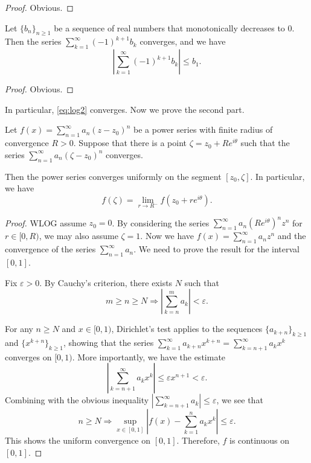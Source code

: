 \documentclass{article}
\begin{document}
\begin{proof}
    Obvious.
\end{proof}

\begin{corollary}
    Let $\{b_n\}_{n\geq 1}$ be a sequence of real numbers that monotonically decreases to $0$. Then the series $\sum_{k=1}^\infty (-1)^{k+1} b_k$ converges, and we have
    \[
        \left\vert \sum_{k=1}^\infty (-1)^{k+1} b_k \right\vert \leq b_1.
    \]
\end{corollary}

\begin{proof}
    Obvious.
\end{proof}

In particular, \eqref{eq:log2} converges. Now we prove the second part.

\begin{theorem}[Abel]
    Let $f(x) = \sum_{n=1}^\infty a_n (z-z_0)^n$ be a power series with finite radius of convergence $R>0$. Suppose that there is a point $\zeta=z_0+Re^{i\theta}$ such that the series $\sum_{n=1}^\infty a_n (\zeta-z_0)^n$ converges. 
    
    Then the power series converges uniformly on the segment $[z_0, \zeta]$. In particular, we have
    \[
        f(\zeta) = \lim_{r\to R^-} f(z_0+re^{i\theta}).
    \]
\end{theorem}

\begin{proof}
    WLOG assume $z_0=0$. By considering the series $\sum_{n=1}^\infty a_n \left(Re^{i\theta}\right)^n z^n$ for $r\in [0,R)$, we may also assume $\zeta=1$. Now we have $f(x) = \sum_{n=1}^\infty a_n z^n$ and the convergence of the series $\sum_{n=1}^\infty a_n$. We need to prove the result for the interval $[0,1]$.

    Fix $\varepsilon>0$. By Cauchy's criterion, there exists $N$ such that 
    \begin{equation*}
        m\geq n\geq N \Longrightarrow \left\vert \sum_{k=n}^m a_k \right\vert < \varepsilon.
    \end{equation*}

    For any $n\geq N$ and $x\in[0,1)$, Dirichlet's test applies to the sequences $\{a_{k+n}\}_{k\geq 1}$ and $\{x^{k+n}\}_{k\geq 1}$, showing that the series $\sum_{k=1}^\infty a_{k+n} x^{k+n}=\sum_{k=n+1}^\infty a_kx^k$ converges on $[0,1)$. More importantly, we have the estimate
    \[
        \left\vert \sum_{k=n+1}^\infty a_k x^k \right\vert \leq \varepsilon x^{n+1} <\varepsilon.
    \]
    Combining with the obvious inequality $\left\vert \sum_{k=n+1}^\infty a_k \right\vert \leq \varepsilon$, we see that
    \[
        n\geq N \Longrightarrow \sup_{x\in[0,1]} \left\vert f(x) - \sum_{k=1}^n a_k x^k \right\vert \leq \varepsilon.
    \]
    This shows the uniform convergence on $[0,1]$. Therefore, $f$ is continuous on $[0,1]$.
\end{proof}
\end{document}
